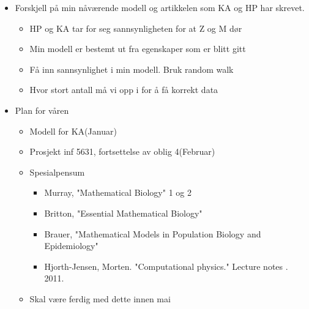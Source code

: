 \documentclass[norsk,11pt,a4paper]{article}
\begin{document}
\begin{itemize}
	\item Forskjell på min nåværende modell og artikkelen som KA og HP har skrevet.
	\begin{itemize}
		\item HP og KA tar for seg sannsynligheten for at Z og M dør
		\item Min modell er bestemt ut fra egenskaper som er blitt gitt
		\item Få inn sannsynlighet i min modell. Bruk random walk
		\item Hvor stort antall må vi opp i for å få korrekt data
	\end{itemize}
	\item{Plan for våren}
	\begin{itemize}
		\item Modell for KA(Januar)
		\item Prosjekt inf 5631, fortsettelse av oblig 4(Februar)
		\item Spesialpensum
		\begin{itemize}
			\item Murray, "Mathematical Biology" 1 og 2
			\item Britton, "Essential Mathematical Biology"
			\item Brauer, "Mathematical Models in Population Biology and Epidemiology"
 			\item Hjorth-Jensen, Morten. "Computational physics." Lecture notes . 2011.
		\end{itemize}
		\item Skal være ferdig med dette innen mai
	\end{itemize}				  
\end{itemize}
\end{document}
